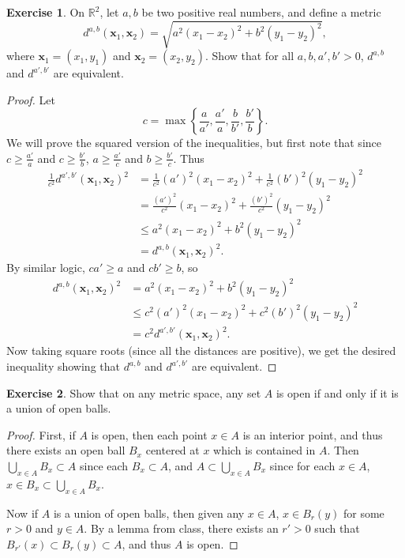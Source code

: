 \documentclass[12pt]{article}
\newcommand{\x}{\mathbf{x}}
\theoremstyle{definition}
\newtheorem{ex}{Exercise}
\begin{document}
\begin{ex}
	On $\mathbb{R}^2$, let $a, b$ be two positive real numbers, and define a metric \begin{equation*}
		d^{a,b}(\x_1, \x_2) = \sqrt{a^2(x_1-x_2)^2 + b^2(y_1-y_2)^2},
	\end{equation*}
	where $\x_1 = (x_1, y_1)$ and $\x_2 = (x_2, y_2)$.
	Show that for all $a, b, a', b' > 0$, $d^{a, b}$ and $d^{a',b'}$ are equivalent.
\end{ex}
\begin{proof}
	Let \begin{equation*}
		c = \max \left\lbrace \frac{a}{a'}, \frac{a'}{a}, \frac{b}{b'}, \frac{b'}{b} \right\rbrace.
	\end{equation*}
	We will prove the squared version of the inequalities, but first note that since $c \geq \frac{a'}{a}$ and $c \geq \frac{b'}{b}$, $a \geq \frac{a'}{c}$ and $b \geq \frac{b'}{c}$.
	Thus \begin{align*}
		\frac{1}{c^2} d^{a',b'}(\x_1, \x_2)^2 & = \frac{1}{c^2}(a')^2(x_1-x_2)^2 + \frac{1}{c^2}(b')^2(y_1-y_2)^2 \\
		                                        & = \frac{(a')^2}{c^2}(x_1-x_2)^2 + \frac{(b')^2}{c^2}(y_1-y_2)^2   \\
		                                        & \leq a^2(x_1-x_2)^2 + b^2(y_1-y_2)^2                              \\
		                                        & = d^{a, b}(\x_1, \x_2)^2.
	\end{align*}
	By similar logic, $ca' \geq a$ and $cb' \geq b$, so \begin{align*}
		d^{a,b}(\x_1, \x_2)^2 & = a^2(x_1-x_2)^2 + b^2(y_1-y_2)^2 \\
                            & \leq c^2(a')^2(x_1-x_2)^2 + c^2(b')^2(y_1-y_2)^2 \\
                            & = c^2d^{a',b'}(\x_1,\x_2)^2.
	\end{align*}
  Now taking square roots (since all the distances are positive), we get the desired inequality showing that $d^{a,b}$ and $d^{a',b'}$ are equivalent.
\end{proof}

\begin{ex}
	Show that on any metric space, any set $A$ is open if and only if it is a union of open balls.
\end{ex}
\begin{proof}
	First, if $A$ is open, then each point $x \in A$ is an interior point, and thus there exists an open ball $B_x$ centered at $x$ which is contained in $A$.
	Then $\bigcup_{x \in A} B_x \subset A$ since each $B_x \subset A$, and $A \subset \bigcup_{x \in A} B_x$ since for each $x \in A$, $x \in B_x \subset \bigcup_{x \in A} B_x$.

	Now if $A$ is a union of open balls, then given any $x \in A$, $x \in B_r(y)$ for some $r > 0$ and $y \in A$.
	By a lemma from class, there exists an $r' > 0$ such that $B_{r'}(x) \subset B_r(y) \subset A$, and thus $A$ is open.
\end{proof}
\end{document}
